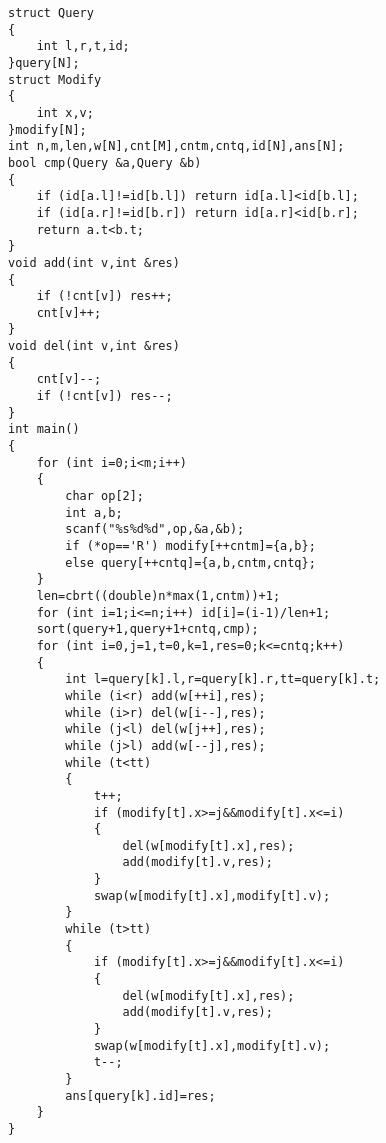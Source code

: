 \documentclass[a4paper]{ctexart}
\begin{document}
\begin{lstlisting}
struct Query
{
    int l,r,t,id;
}query[N];
struct Modify
{
    int x,v;
}modify[N];
int n,m,len,w[N],cnt[M],cntm,cntq,id[N],ans[N];
bool cmp(Query &a,Query &b)
{
    if (id[a.l]!=id[b.l]) return id[a.l]<id[b.l];
    if (id[a.r]!=id[b.r]) return id[a.r]<id[b.r];
    return a.t<b.t;
}
void add(int v,int &res)
{
    if (!cnt[v]) res++;
    cnt[v]++;
}
void del(int v,int &res)
{
    cnt[v]--;
    if (!cnt[v]) res--;
}
int main()
{
    for (int i=0;i<m;i++)
    {
        char op[2];
        int a,b;
        scanf("%s%d%d",op,&a,&b);
        if (*op=='R') modify[++cntm]={a,b};
        else query[++cntq]={a,b,cntm,cntq};
    }
    len=cbrt((double)n*max(1,cntm))+1;
    for (int i=1;i<=n;i++) id[i]=(i-1)/len+1;
    sort(query+1,query+1+cntq,cmp);
    for (int i=0,j=1,t=0,k=1,res=0;k<=cntq;k++)
    {
        int l=query[k].l,r=query[k].r,tt=query[k].t;
        while (i<r) add(w[++i],res);
        while (i>r) del(w[i--],res);
        while (j<l) del(w[j++],res);
        while (j>l) add(w[--j],res);
        while (t<tt)
        {
            t++;
            if (modify[t].x>=j&&modify[t].x<=i)
            {
                del(w[modify[t].x],res);
                add(modify[t].v,res);
            }
            swap(w[modify[t].x],modify[t].v);
        }
        while (t>tt)
        {
            if (modify[t].x>=j&&modify[t].x<=i)
            {
                del(w[modify[t].x],res);
                add(modify[t].v,res);
            }
            swap(w[modify[t].x],modify[t].v);
            t--;
        }
        ans[query[k].id]=res;
    }
}
\end{lstlisting}
\end{document}
